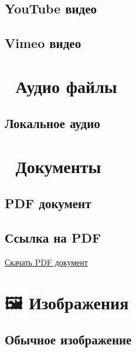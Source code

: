 \documentclass[
  russian,
  12pt,
  a4paper,
]{article}
\begin{document}
\subsection{YouTube видео}\label{youtube-ux432ux438ux434ux435ux43e}

\subsection{Vimeo видео}\label{vimeo-ux432ux438ux434ux435ux43e}

\section{🎵 Аудио
файлы}\label{ux430ux443ux434ux438ux43e-ux444ux430ux439ux43bux44b}

\subsection{Локальное
аудио}\label{ux43bux43eux43aux430ux43bux44cux43dux43eux435-ux430ux443ux434ux438ux43e}

\section{📄
Документы}\label{ux434ux43eux43aux443ux43cux435ux43dux442ux44b}

\subsection{PDF
документ}\label{pdf-ux434ux43eux43aux443ux43cux435ux43dux442}

\subsection{Ссылка на
PDF}\label{ux441ux441ux44bux43bux43aux430-ux43dux430-pdf}

\href{media/document.pdf}{Скачать PDF документ}

\section{🖼️
Изображения}\label{ux438ux437ux43eux431ux440ux430ux436ux435ux43dux438ux44f}

\subsection{Обычное
изображение}\label{ux43eux431ux44bux447ux43dux43eux435-ux438ux437ux43eux431ux440ux430ux436ux435ux43dux438ux435}
\end{document}
